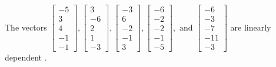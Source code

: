 \begin{exercise}
\begin{exerciseStatement}
  \end{exerciseStatement}
  \begin{exerciseAnswer}
   The vectors \(\left[\begin{array}{r}
-5 \\
3 \\
4 \\
-1 \\
-1
\end{array}\right] , \left[\begin{array}{r}
3 \\
-6 \\
2 \\
1 \\
-3
\end{array}\right] , \left[\begin{array}{r}
-3 \\
6 \\
-2 \\
-1 \\
3
\end{array}\right] , \left[\begin{array}{r}
-6 \\
-2 \\
-2 \\
-1 \\
-5
\end{array}\right] , \text{ and } \left[\begin{array}{r}
-6 \\
-3 \\
-7 \\
-11 \\
-3
\end{array}\right]\) are 
  	 linearly dependent  .
  


  \end{exerciseAnswer}
\end{exercise}